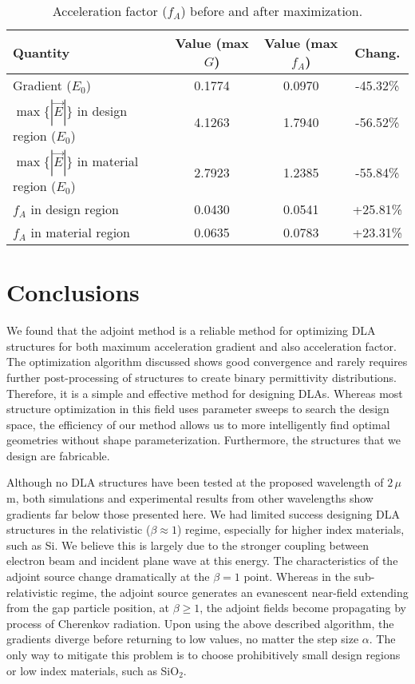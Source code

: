 \begin{table}[ht!]
\centering
\caption{Acceleration factor ($f_A$) before and after maximization.}
\begin{tabular}{lccc}
\hline
Quantity & Value (max $G$) & Value (max $f_A$) & Chang.
\\ \hline
Gradient ($E_0$) & 0.1774 & 0.0970 & -45.32\%\\ 
$\max\{|\vec{E}|\}$ in design region ($E_0$) & 4.1263 & 1.7940 & -56.52\%\\ 
$\max\{|\vec{E}|\}$ in material region ($E_0$) & 2.7923 & 1.2385 & -55.84\% \\ 
$f_A$ in design region & 0.0430 & 0.0541 & +25.81\% \\
$f_A$ in material region & 0.0635 & 0.0783 & +23.31\% \\ \hline
\end{tabular}
\label{tb:table}
\end{table}

\section{Conclusions}

We found that the adjoint method is a reliable method for optimizing DLA structures for both maximum acceleration gradient and also acceleration factor.
The optimization algorithm discussed shows good convergence and rarely requires further post-processing of structures to create binary permittivity distributions.
Therefore, it is a simple and effective method for designing DLAs.
Whereas most structure optimization in this field uses parameter sweeps to search the design space, the efficiency of our method allows us to more intelligently find optimal geometries without shape parameterization.
Furthermore, the structures that we design are fabricable.

Although no DLA structures have been tested at the proposed wavelength of $2\, \mu$m, both simulations \cite{plettner2006proposed} and experimental results from other wavelengths \cite{leedle2015dielectric} show gradients far below those presented here.
We had limited success designing DLA structures in the relativistic ($\beta \approx 1$) regime, especially for higher index materials, such as Si.
We believe this is largely due to the stronger coupling between electron beam and incident plane wave at this energy.
The characteristics of the adjoint source change dramatically at the $\beta = 1$ point.
Whereas in the sub-relativistic regime, the adjoint source generates an evanescent near-field extending from the gap particle position, at $\beta \geq 1$, the adjoint fields become propagating by process of Cherenkov radiation. Upon using the above described algorithm, the gradients diverge before returning to low values, no matter the step size $\alpha$.
The only way to mitigate this problem is to choose prohibitively small design regions or low index materials, such as SiO$_2$.

